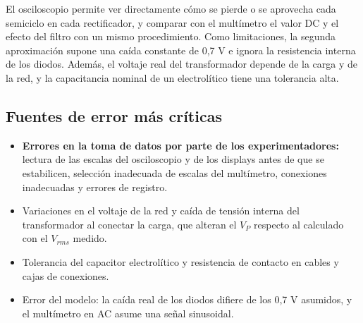 El osciloscopio permite ver directamente cómo se pierde o se aprovecha cada
semiciclo en cada rectificador, y comparar con el multímetro el valor DC y
el efecto del filtro con un mismo procedimiento. Como limitaciones, la
segunda aproximación supone una caída constante de 0,7 V e ignora la
resistencia interna de los diodos. Además, el voltaje real del transformador
depende de la carga y de la red, y la capacitancia nominal de un electrolítico
tiene una tolerancia alta.

\subsection{Fuentes de error más críticas}

\begin{itemize}
    \item \textbf{Errores en la toma de datos por parte de los
    experimentadores:} lectura de las escalas del osciloscopio y de los
    displays antes de que se estabilicen, selección inadecuada de escalas del
    multímetro, conexiones inadecuadas y errores de registro.
    \item Variaciones en el voltaje de la red y caída de tensión interna del
    transformador al conectar la carga, que alteran el $V_P$ respecto al
    calculado con el $V_{rms}$ medido.
    \item Tolerancia del capacitor electrolítico y resistencia de contacto
    en cables y cajas de conexiones.
    \item Error del modelo: la caída real de los diodos difiere de los
    0,7 V asumidos, y el multímetro en AC asume una señal sinusoidal.

\end{itemize}
